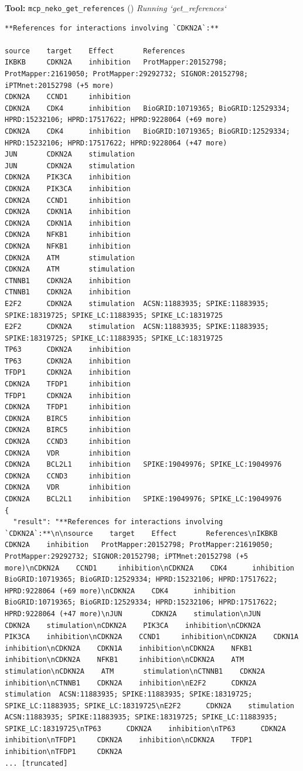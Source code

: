\documentclass[11pt,a4paper]{article}
\begin{document}
\begin{toolokbox}
\textbf{Tool:} \texttt{mcp\_neko\_get\_references} (\checkmark)
\textit{Running `get\_references`}
\begin{lstlisting}
**References for interactions involving `CDKN2A`:**

source    target    Effect       References
IKBKB     CDKN2A    inhibition   ProtMapper:20152798; ProtMapper:21619050; ProtMapper:29292732; SIGNOR:20152798; iPTMnet:20152798 (+5 more)
CDKN2A    CCND1     inhibition
CDKN2A    CDK4      inhibition   BioGRID:10719365; BioGRID:12529334; HPRD:15232106; HPRD:17517622; HPRD:9228064 (+69 more)
CDKN2A    CDK4      inhibition   BioGRID:10719365; BioGRID:12529334; HPRD:15232106; HPRD:17517622; HPRD:9228064 (+47 more)
JUN       CDKN2A    stimulation
JUN       CDKN2A    stimulation
CDKN2A    PIK3CA    inhibition
CDKN2A    PIK3CA    inhibition
CDKN2A    CCND1     inhibition
CDKN2A    CDKN1A    inhibition
CDKN2A    CDKN1A    inhibition
CDKN2A    NFKB1     inhibition
CDKN2A    NFKB1     inhibition
CDKN2A    ATM       stimulation
CDKN2A    ATM       stimulation
CTNNB1    CDKN2A    inhibition
CTNNB1    CDKN2A    inhibition
E2F2      CDKN2A    stimulation  ACSN:11883935; SPIKE:11883935; SPIKE:18319725; SPIKE_LC:11883935; SPIKE_LC:18319725
E2F2      CDKN2A    stimulation  ACSN:11883935; SPIKE:11883935; SPIKE:18319725; SPIKE_LC:11883935; SPIKE_LC:18319725
TP63      CDKN2A    inhibition
TP63      CDKN2A    inhibition
TFDP1     CDKN2A    inhibition
CDKN2A    TFDP1     inhibition
TFDP1     CDKN2A    inhibition
CDKN2A    TFDP1     inhibition
CDKN2A    BIRC5     inhibition
CDKN2A    BIRC5     inhibition
CDKN2A    CCND3     inhibition
CDKN2A    VDR       inhibition
CDKN2A    BCL2L1    inhibition   SPIKE:19049976; SPIKE_LC:19049976
CDKN2A    CCND3     inhibition
CDKN2A    VDR       inhibition
CDKN2A    BCL2L1    inhibition   SPIKE:19049976; SPIKE_LC:19049976
{
  "result": "**References for interactions involving `CDKN2A`:**\n\nsource    target    Effect       References\nIKBKB     CDKN2A    inhibition   ProtMapper:20152798; ProtMapper:21619050; ProtMapper:29292732; SIGNOR:20152798; iPTMnet:20152798 (+5 more)\nCDKN2A    CCND1     inhibition\nCDKN2A    CDK4      inhibition   BioGRID:10719365; BioGRID:12529334; HPRD:15232106; HPRD:17517622; HPRD:9228064 (+69 more)\nCDKN2A    CDK4      inhibition   BioGRID:10719365; BioGRID:12529334; HPRD:15232106; HPRD:17517622; HPRD:9228064 (+47 more)\nJUN       CDKN2A    stimulation\nJUN       CDKN2A    stimulation\nCDKN2A    PIK3CA    inhibition\nCDKN2A    PIK3CA    inhibition\nCDKN2A    CCND1     inhibition\nCDKN2A    CDKN1A    inhibition\nCDKN2A    CDKN1A    inhibition\nCDKN2A    NFKB1     inhibition\nCDKN2A    NFKB1     inhibition\nCDKN2A    ATM       stimulation\nCDKN2A    ATM       stimulation\nCTNNB1    CDKN2A    inhibition\nCTNNB1    CDKN2A    inhibition\nE2F2      CDKN2A    stimulation  ACSN:11883935; SPIKE:11883935; SPIKE:18319725; SPIKE_LC:11883935; SPIKE_LC:18319725\nE2F2      CDKN2A    stimulation  ACSN:11883935; SPIKE:11883935; SPIKE:18319725; SPIKE_LC:11883935; SPIKE_LC:18319725\nTP63      CDKN2A    inhibition\nTP63      CDKN2A    inhibition\nTFDP1     CDKN2A    inhibition\nCDKN2A    TFDP1     inhibition\nTFDP1     CDKN2A   
... [truncated]
\end{lstlisting}
\end{toolokbox}
\end{document}
